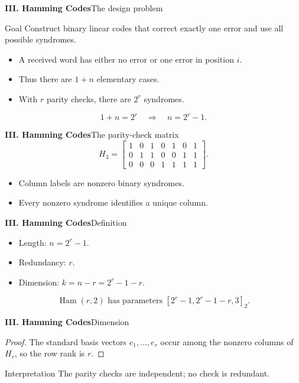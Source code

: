 \begin{frame}{\textbf{III. Hamming Codes}}{The design problem}
\small
\begin{block}{Goal}
Construct binary linear codes that correct exactly one error and use all possible syndromes.
\end{block}
\begin{itemize}
  \item A received word has either no error or one error in position $i$.
  \item Thus there are $1+n$ elementary cases.
  \item With $r$ parity checks, there are $2^r$ syndromes.
\end{itemize}
\[
  1+n=2^r
  \quad\Rightarrow\quad
  n=2^r-1.
\]
\end{frame}

\begin{frame}{\textbf{III. Hamming Codes}}{The parity-check matrix}
\small
{}
\[
  H_3=
  \begin{bmatrix}
  1&0&1&0&1&0&1\\
  0&1&1&0&0&1&1\\
  0&0&0&1&1&1&1
  \end{bmatrix}.
\]
\begin{itemize}
  \item Column labels are nonzero binary syndromes.
  \item Every nonzero syndrome identifies a unique column.
\end{itemize}
\end{frame}

\begin{frame}{\textbf{III. Hamming Codes}}{Definition}
\small
{}
\begin{itemize}
  \item Length: $n=2^r-1$.
  \item Redundancy: $r$.
  \item Dimension: $k=n-r=2^r-1-r$.
\end{itemize}
\[
  \operatorname{Ham}(r,2)\text{ has parameters }[2^r-1,2^r-1-r,3]_2.
\]
\end{frame}

\begin{frame}{\textbf{III. Hamming Codes}}{Dimension}
\small
{}
\begin{proof}
The standard basis vectors $e_1,\ldots,e_r$ occur among the nonzero columns of $H_r$, so the row rank is $r$.
\end{proof}
\begin{block}{Interpretation}
The parity checks are independent; no check is redundant.
\end{block}
\end{frame}

